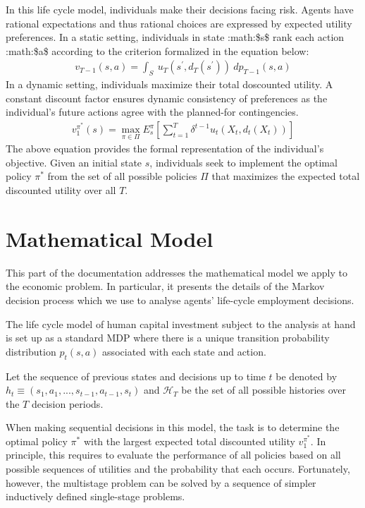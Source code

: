 \documentclass[letterpaper,10pt,english]{sphinxmanual}
\begin{document}
In this life cycle model, individuals make their decisions facing risk. Agents have rational expectations and thus rational choices are expressed by expected utility preferences. In a static setting, individuals in state :math:\$s\$ rank each action :math:\$a\$ according to the criterion formalized in the equation below:
\begin{equation*}
\begin{split}v_{T - 1}(s, a) = \int_S \:u_T(s^\prime, d_T(s^\prime))\: dp_{T - 1}(s, a)\end{split}
\end{equation*}
In a dynamic setting, individuals maximize their total doscounted utility. A constant discount factor ensures dynamic consistency of preferences as the individual’s future actions agree with the planned-for contingencies.
\begin{equation*}
\begin{split}v^{\pi^*}_1(s) = \max_{\pi \in \Pi} E_{s}^\pi\left[\sum^{T}_{t = 1}  \delta^{t - 1} u_t(X_t, d_t(X_t))\right]\end{split}
\end{equation*}
The above equation provides the formal representation of the individual’s objective. Given an initial state \(s\), individuals seek to implement the optimal policy \(\pi^*\) from the set of all possible policies \(\Pi\) that maximizes the expected total discounted utility over all \(T\).


\chapter{Mathematical Model}
\label{\detokenize{mathematical_model:mathematical-model}}\label{\detokenize{mathematical_model::doc}}
This part of the documentation addresses the mathematical model we apply to the economic problem. In particular, it presents the details of the Markov decision process which we use to analyse agents’ life-cycle employment decisions.

The life cycle model of human capital investment subject to the analysis at hand is set up as a standard MDP where there is a unique transition probability distribution \(p_t(s, a)\) associated with each state and action.

Let the sequence of previous states and decisions up to time \(t\) be denoted by \(h_t \equiv (s_1, a_1, ..., s_{t -1}, a_{t - 1}, s_t)\) and \(\mathcal{H}_T\) be the set of all possible histories over the \(T\) decision periods.

When making sequential decisions in this model, the task is to determine the optimal policy \(\pi^*\) with the largest expected total discounted utility \(v^{\pi^*}_1\). In principle, this requires to evaluate the performance of all policies based on all possible sequences of utilities and the probability that each occurs. Fortunately, however, the multistage problem can be solved by a sequence of simpler inductively defined single-stage problems.
\end{document}

